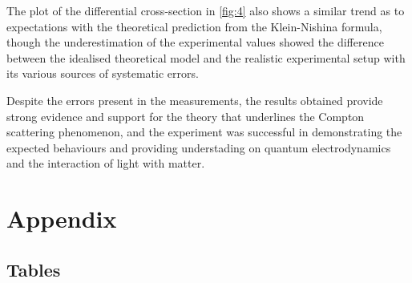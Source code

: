 \documentclass[11pt, a4paper, twocolumn]{article}
\begin{document}
The plot of the differential cross-section in \autoref{fig:4} also shows a similar trend as to expectations with the theoretical prediction from the Klein-Nishina formula, though the underestimation of the experimental values showed the difference between the idealised theoretical model and the realistic experimental setup with its various sources of systematic errors.

Despite the errors present in the measurements, the results obtained provide strong evidence and support for the theory that underlines the Compton scattering phenomenon, and the experiment was successful in demonstrating the expected behaviours and providing understading on quantum electrodynamics and the interaction of light with matter.


\onecolumn


 \label{sec:ref}

\newpage

\section*{Appendix} \label{sec:A}

\subsection*{Tables}
\end{document}
